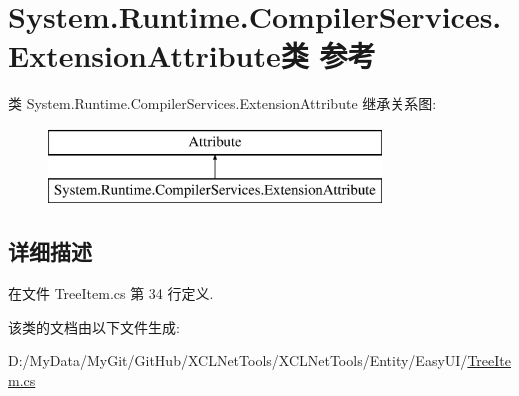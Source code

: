 \hypertarget{class_system_1_1_runtime_1_1_compiler_services_1_1_extension_attribute}{\section{System.\-Runtime.\-Compiler\-Services.\-Extension\-Attribute类 参考}
\label{class_system_1_1_runtime_1_1_compiler_services_1_1_extension_attribute}
}
类 System.\-Runtime.\-Compiler\-Services.\-Extension\-Attribute 继承关系图\-:\begin{figure}[H]
\begin{center}
\leavevmode
\includegraphics[height=2.000000cm]{class_system_1_1_runtime_1_1_compiler_services_1_1_extension_attribute}
\end{center}
\end{figure}


\subsection{详细描述}


在文件 Tree\-Item.\-cs 第 34 行定义.



该类的文档由以下文件生成\-:\begin{DoxyCompactItemize}
\item 
D\-:/\-My\-Data/\-My\-Git/\-Git\-Hub/\-X\-C\-L\-Net\-Tools/\-X\-C\-L\-Net\-Tools/\-Entity/\-Easy\-U\-I/\hyperlink{_tree_item_8cs}{Tree\-Item.\-cs}\end{DoxyCompactItemize}
